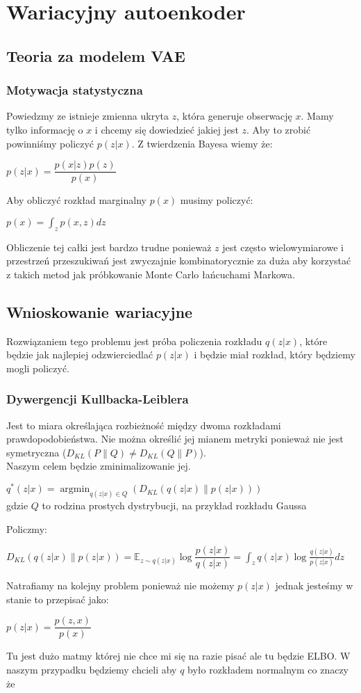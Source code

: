 \documentclass[a4paper,12pt]{book} %
\begin{document}
\chapter{Wariacyjny autoenkoder}
\section{Teoria za modelem VAE}
\subsection{Motywacja statystyczna}
Powiedzmy ze istnieje zmienna ukryta $z$, która generuje obserwację $x$. Mamy tylko informację o $x$ i chcemy się dowiedzieć jakiej jest $z$. Aby to zrobić powinniśmy policzyć $p(z|x)$. Z twierdzenia Bayesa wiemy że:\\
\begin{center}
	$p(z|x)=\dfrac{p(x|z)p(z)}{p(x)}$
\end{center}
Aby obliczyć rozkład marginalny $p(x)$ musimy policzyć:
\begin{center}
	$p(x) = \displaystyle\int_{z}^{}p(x,z)dz$
\end{center}
Obliczenie tej całki jest bardzo trudne ponieważ $z$ jest często wielowymiarowe i przestrzeń przeszukiwań jest zwyczajnie kombinatorycznie za duża aby korzystać z takich metod jak próbkowanie Monte Carlo łańcuchami Markowa. \\

\section{Wnioskowanie wariacyjne}
Rozwiązaniem tego problemu jest próba policzenia rozkładu $q(z|x)$, które będzie jak najlepiej odzwierciedlać $p(z|x)$ i będzie miał rozkład, który będziemy mogli policzyć. 
\subsection{Dywergencji Kullbacka-Leiblera}
Jest to miara określająca rozbieżność między dwoma rozkładami prawdopodobieństwa. Nie można określić jej mianem metryki ponieważ nie jest symetryczna ($D_{KL}(P\|Q)\neq  D_{KL}(Q\|P)$).\\ Naszym celem będzie zminimalizowanie jej.
\begin{center}
	$q^\ast(z|x)=\operatorname*{argmin}_{q(z|x)\in Q}(D_{KL}(q(z|x)\|p(z|x)))$
	\\gdzie $Q$ to rodzina prostych dystrybucji, na przykład rozkładu Gaussa 
\end{center}
Policzmy:
\begin{center}
	$D_{KL}(q(z|x)\|p(z|x))=\mathbb{E}_{z\sim q(z|x)}\log\dfrac{p(z|x)}{q(z|x)} = 
	\displaystyle\int_{z}^{}q(z|x)\log\frac{q(z|x)}{p(z|x)}dz$
\end{center}
	 Natrafiamy na kolejny problem ponieważ nie możemy $p(z|x)$ jednak jesteśmy w stanie to przepisać jako:\\
\begin{center}
	$p(z|x)=\dfrac{p(z,x)}{p(x)}$
\end{center}
Tu jest dużo matmy której nie chce mi się na razie pisać ale tu będzie ELBO.
\newpage
W naszym przypadku będziemy chcieli aby $q$ było rozkładem normalnym co znaczy że
\end{document}
